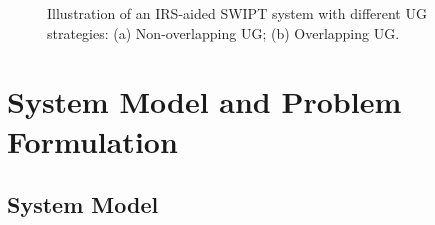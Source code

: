 \documentclass[12pt,draftclsnofoot, onecolumn]{IEEEtran}
\theoremstyle{plain}
\begin{document}
\begin{sloppypar}
\begin{figure}[!t]
	\vspace{-2mm}
	\centering
	\hspace{2mm}
	\caption{Illustration of an IRS-aided SWIPT system with different UG strategies: (a) Non-overlapping UG; (b) Overlapping UG. }
	\label{fig:system_model}
	\vspace{-3mm}
\end{figure}

\section{System Model and Problem Formulation}\label{Sec:model_formu}
\subsection{System Model}


\end{sloppypar}
\end{document}
